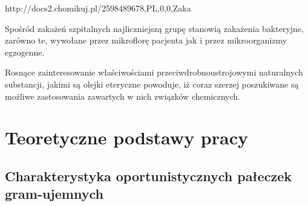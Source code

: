 \documentclass[11pt,a4paper]{report}
\begin{document}
http://docs2.chomikuj.pl/2598489678,PL,0,0,Zaka%

Spośród zakażeń szpitalnych najliczniejszą grupę stanowią zakażenia bakteryjne, zarówno te, wywołane przez mikroflorę pacjenta jak i przez mikroorganizmy egzogenne.\cite{zakszpit16}

Rosnące zainteresowanie właściwościami przeciwdrobnoustrojowymi naturalnych substancji, jakimi są olejki eteryczne powoduje, iż coraz szerzej poszukiwane są możliwe zastosowania zawartych w nich związków chemicznych. 
\cite{manukaikanuka}












\chapter{Teoretyczne podstawy pracy}
\section{Charakterystyka oportunistycznych pałeczek gram-ujemnych}
\end{document}
